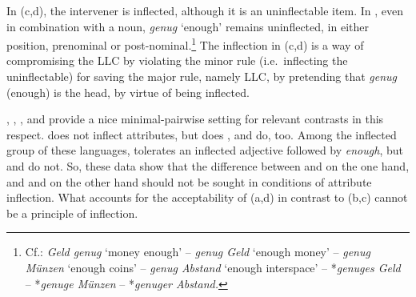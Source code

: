\documentclass[output=paper
  ,nobabel
  ,uniformtopskip %
]{langscibook}
\begin{document}
\label{ex-beine}

\label{ex-groß}

\label{ex-fest}
\zl

\noindent
In (c,d), the intervener is inflected, although it is an uninflectable item. In , even in combination with a noun, \emph{genug} `enough' remains uninflected, in either position, prenominal or post-nominal.\footnote{Cf.: \emph{Geld genug} `money enough' – \emph{genug Geld} `enough money' – \emph{genug Münzen}  `enough coins' – \emph{genug Abstand} `enough interspace' – *\emph{genuges Geld} – *\emph{genuge Münzen} – *\emph{genuger Abstand.}} The inflection in (c,d) is a way of compromising the LLC by violating the minor rule (i.e.\ inflecting the uninflectable) for saving the major rule, namely LLC, by pretending that \emph{genug} (enough) is the head, by virtue of being inflected.

, , , and  provide a nice minimal-pairwise setting for relevant contrasts in this respect.  does not inflect attributes, but  does \citep[454]{Broekhuis2013},  and  \citep[180]{Fabricius-Hansen2010} do, too. Among the inflected group of these languages,  tolerates an inflected adjective followed by \emph{enough}, but  and  do not. So, these data show that the difference between  and  on the one hand, and  and  on the other hand should not be sought in conditions of attribute inflection. What accounts for the acceptability of (a,d) in contrast to (b,c) cannot be a principle of inflection.
\end{document}
